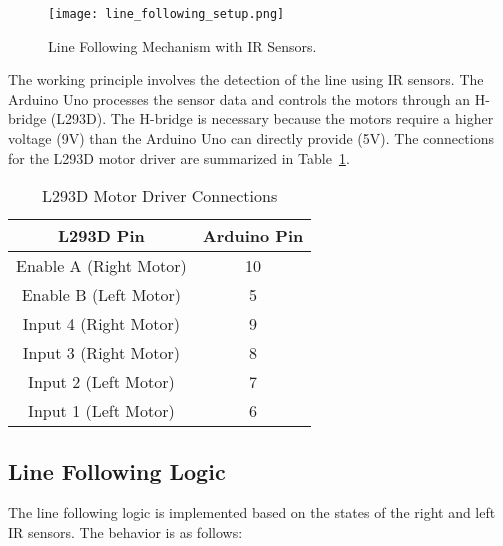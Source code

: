 \documentclass[conference]{IEEEtran}
\begin{document}
\begin{figure}[H]
    \centering
    \texttt{[image: line\_following\_setup.png]}
    \caption{Line Following Mechanism with IR Sensors.}
    \label{fig:line_following}
\end{figure}

The working principle involves the detection of the line using IR sensors. The Arduino Uno processes the sensor data and controls the motors through an H-bridge (L293D). The H-bridge is necessary because the motors require a higher voltage (9V) than the Arduino Uno can directly provide (5V). The connections for the L293D motor driver are summarized in Table~\ref{tab:l293d_connections}.

\begin{table}[H]
    \caption{L293D Motor Driver Connections}
    \begin{center}
        \begin{tabular}{|c|c|}
            \hline
            \textbf{L293D Pin} & \textbf{Arduino Pin} \\
            \hline
            Enable A (Right Motor) & 10 \\
            \hline
            Enable B (Left Motor) & 5 \\
            \hline
            Input 4 (Right Motor) & 9 \\
            \hline
            Input 3 (Right Motor) & 8 \\
            \hline
            Input 2 (Left Motor) & 7 \\
            \hline
            Input 1 (Left Motor) & 6 \\
            \hline
        \end{tabular}
        \label{tab:l293d_connections}
    \end{center}
\end{table}

\subsection{Line Following Logic}
The line following logic is implemented based on the states of the right and left IR sensors. The behavior is as follows:
\end{document}
